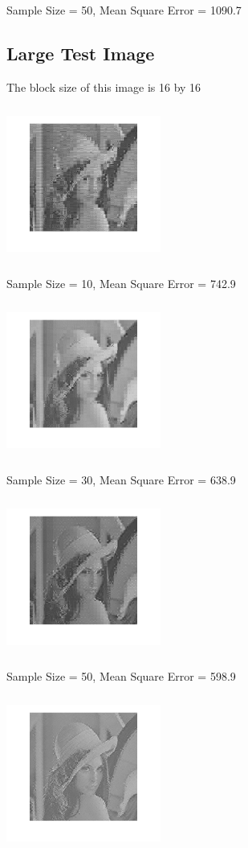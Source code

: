 \documentclass{article}
\begin{document}
Sample Size = 50, Mean Square Error = 1090.7

\subsection{Large Test Image}
The block size of this image is 16 by 16

\includegraphics[width=2in,height=2in]{2-10.png}
\vspace{-0.1in}

Sample Size = 10, Mean Square Error = 742.9

\includegraphics[width=2in,height=2in]{2-30.png}
\vspace{-0.1in}

Sample Size = 30, Mean Square Error = 638.9
 
\includegraphics[width=2in,height=2in]{2-50.png}
\vspace{-0.1in}

Sample Size = 50, Mean Square Error = 598.9

\includegraphics[width=2in,height=2in]{2-100.png}
\vspace{-0.1in}
\end{document}
